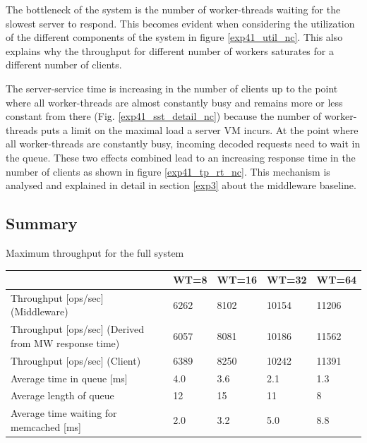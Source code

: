 \documentclass[report.tex]{subfiles}
\begin{document}
The bottleneck of the system is the number of worker-threads waiting for the slowest server to respond.
This becomes evident when considering the utilization of the different components of the system in figure \ref{exp41_util_nc}. This also explains why the throughput for different number of workers saturates for a different number of clients.


The server-service time is increasing in the number of clients up to the point where all worker-threads are almost constantly busy and remains more or less constant from there (Fig. \ref{exp41_sst_detail_nc}) because the number of worker-threads puts a limit on the maximal load a server VM incurs. At the point where all worker-threads are constantly busy, incoming decoded requests need to wait in the queue. These two effects combined lead to an increasing response time in the number of clients as shown in figure \ref{exp41_tp_rt_nc}. This mechanism is analysed and explained in detail in section \ref{exp3} about the middleware baseline.


\subsection{Summary}


\begin{center}
	{Maximum throughput for the full system}
	\begin{tabular}{|l|p{1.5cm}|p{1.5cm}|p{1.5cm}|p{1.5cm}|}
		\hline                                            			& WT=8 & WT=16 & WT=32 & WT=64 \\ 
		\hline Throughput [ops/sec] (Middleware)                    & 6262 &  8102 & 10154 & 11206 \\ 
		\hline Throughput [ops/sec] (Derived from MW response time) & 6057 &  8081 & 10186 & 11562 \\ 
		\hline Throughput [ops/sec] (Client)              			& 6389 &  8250 & 10242 & 11391 \\ 
		\hline Average time in queue [ms]                 			&  4.0 &   3.6 &   2.1 &   1.3 \\ 
		\hline Average length of queue                    			&   12 &    15 &    11 &     8 \\ 
		\hline Average time waiting for memcached [ms]    			&  2.0 &   3.2 &   5.0 &   8.8 \\ 
		\hline 
	\end{tabular}
\end{center}
\end{document}
